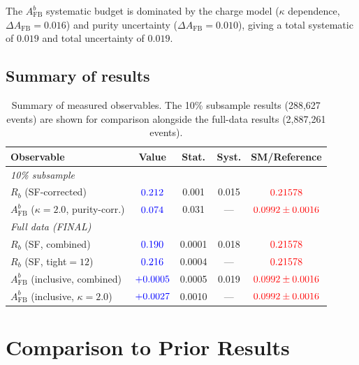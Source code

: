 \documentclass[11pt,a4paper]{article}
\newcommand{\measured}[1]{\textcolor{blue}{#1}}
\newcommand{\external}[1]{\textcolor{red}{#1}}
\begin{document}
The $A_\text{FB}^b$ systematic budget is dominated by the charge
model ($\kappa$ dependence, $\Delta A_\text{FB} = 0.016$) and
purity uncertainty ($\Delta A_\text{FB} = 0.010$), giving a total
systematic of $0.019$ and total uncertainty of $0.019$.

\subsection{Summary of results}
\label{sec:results:summary}

\begin{table}[htbp]
\centering
\caption{Summary of measured observables.
The 10\% subsample results (288,627 events) are shown for
comparison alongside the full-data results (2,887,261 events).}
\label{tbl:results_summary}
\begin{tabular}{lcccc}
\toprule
Observable & Value & Stat. & Syst. & SM/Reference \\
\midrule
\multicolumn{5}{l}{\textit{10\% subsample}} \\
$R_b$ (SF-corrected) & $\measured{0.212}$ & 0.001 & 0.015 &
  $\external{0.21578}$ \\
$A_\text{FB}^b$ ($\kappa = 2.0$, purity-corr.) & $\measured{0.074}$ & 0.031 & --- &
  $\external{0.0992 \pm 0.0016}$ \\
\midrule
\multicolumn{5}{l}{\textit{Full data (FINAL)}} \\
$R_b$ (SF, combined) & $\measured{0.190}$ & 0.0001 & 0.018 &
  $\external{0.21578}$ \\
$R_b$ (SF, tight$=12$) & $\measured{0.216}$ & 0.0004 & --- &
  $\external{0.21578}$ \\
$A_\text{FB}^b$ (inclusive, combined) & $\measured{+0.0005}$ & 0.0005 & 0.019 &
  $\external{0.0992 \pm 0.0016}$ \\
$A_\text{FB}^b$ (inclusive, $\kappa = 2.0$) & $\measured{+0.0027}$ & 0.0010 & --- &
  $\external{0.0992 \pm 0.0016}$ \\
\bottomrule
\end{tabular}
\end{table}

\section{Comparison to Prior Results}
\label{sec:comparison}
\end{document}
